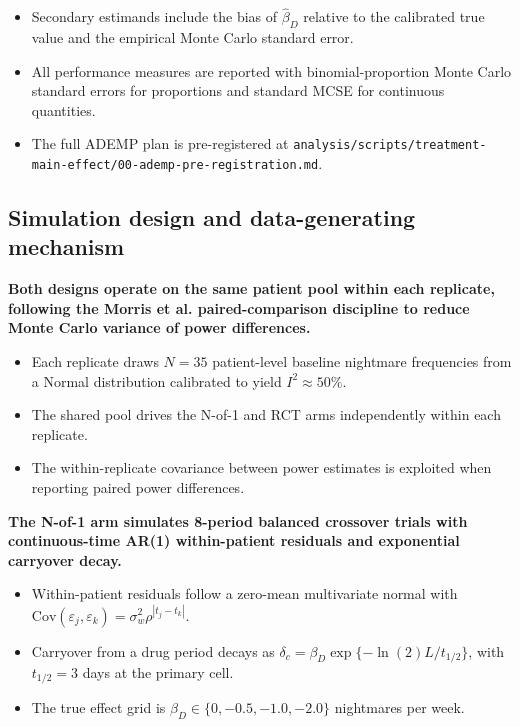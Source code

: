 \documentclass[
  11pt,
]{article}
\begin{document}
\begin{itemize}\setlength{\itemsep}{2pt}\setlength{\parskip}{0pt}
\item Secondary estimands include the bias of $\hat{\beta}_D$ relative to the calibrated true value and the empirical Monte Carlo standard error.
\item All performance measures are reported with binomial-proportion Monte Carlo standard errors for proportions and standard MCSE for continuous quantities.
\item The full ADEMP plan is pre-registered at \texttt{analysis/scripts/treatment-main-effect/00-ademp-pre-registration.md}.
\end{itemize}

\subsection{Simulation design and data-generating mechanism}\label{simulation-design-and-data-generating-mechanism}

\textbf{Both designs operate on the same patient pool within each replicate, following the Morris et al. paired-comparison discipline to reduce Monte Carlo variance of power differences.}

\begin{itemize}\setlength{\itemsep}{2pt}\setlength{\parskip}{0pt}
\item Each replicate draws $N = 35$ patient-level baseline nightmare frequencies from a Normal distribution calibrated to yield $I^2 \approx 50\%$.
\item The shared pool drives the N-of-1 and RCT arms independently within each replicate.
\item The within-replicate covariance between power estimates is exploited when reporting paired power differences.
\end{itemize}

\textbf{The N-of-1 arm simulates 8-period balanced crossover trials with continuous-time AR(1) within-patient residuals and exponential carryover decay.}

\begin{itemize}\setlength{\itemsep}{2pt}\setlength{\parskip}{0pt}
\item Within-patient residuals follow a zero-mean multivariate normal with $\text{Cov}(\varepsilon_j, \varepsilon_k) = \sigma_w^2 \rho^{|t_j - t_k|}$.
\item Carryover from a drug period decays as $\delta_c = \beta_D \exp\{-\ln(2) L / t_{1/2}\}$, with $t_{1/2} = 3$ days at the primary cell.
\item The true effect grid is $\beta_D \in \{0, -0.5, -1.0, -2.0\}$ nightmares per week.
\end{itemize}
\end{document}
